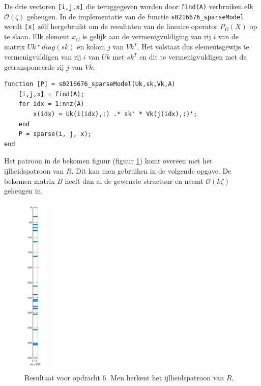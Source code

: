 

De drie vectoren \texttt{[i,j,x]} die teruggegeven worden door \texttt{find(A)} verbruiken elk $\mathcal{O}(\zeta)$ geheugen. In de implementatie van de functie \texttt{s0216676\_sparseModel} wordt \texttt{[x]} z\'elf hergebruikt om de resultaten van de lineaire operator $P_{\Omega}(X)$ op te slaan. Elk element $x_{ij}$ is gelijk aan de vermenigvuldiging van rij $i$ van de matrix $Uk*diag(sk)$ en kolom $j$ van $Vk^T$. Het volstaat dus elementsgewijs te vermenigvuldigen van rij $i$ van $Uk$ met $sk^T$ en dit te vermenigvuldigen met de getransponeerde rij $j$ van $Vk$.

\begin{lstlisting}
function [P] = s0216676_sparseModel(Uk,sk,Vk,A)
    [i,j,x] = find(A);
    for idx = 1:nnz(A)
        x(idx) = Uk(i(idx),:) .* sk' * Vk(j(idx),:)';
    end
    P = sparse(i, j, x);
end
\end{lstlisting}



Het patroon in de bekomen figuur (figuur \ref{fig:op6}) komt overeen met het ijlheidspatroon van $R$. Dit kan men gebruiken in de volgende opgave. De bekomen matrix $B$ heeft dan al de gewenste structuur en neemt $\mathcal{O}(k\zeta)$ geheugen in.

\begin{figure}[h]
\centering
\includegraphics[width=0.1\textwidth]{res/op6.png}
\caption{Resultaat voor opdracht 6. Men herkent het ijlheidspatroon van $R$.}
\label{fig:op6}
\end{figure}


